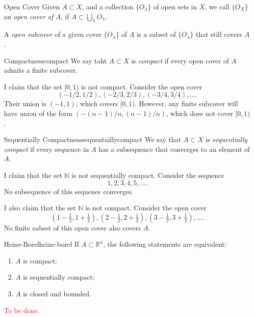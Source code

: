 
\begin{defn}{Open Cover}{}
	Given \(A \subset X\), and a collection \(\{O_\lambda\}\) of open sets in  \(X\), we call \(\{O_X\}\) an \emph{open cover of \(A\)}, if \(A \subset \bigcup_\lambda O_\lambda\).

	A \emph{open subcover} of a given cover \(\{O_\lambda\}\) of \(A\) is a subset of \(\{O_\lambda\}\) that still covers \(A\).
\end{defn}

\begin{defn}{Compactness}{compact}
	We say taht \(A \subset X\) is \emph{compact} if every open cover of \(A\) admits a finite subcover.
\end{defn}

\begin{exmp}{}{}
	I claim that the set \([0, 1)\) is not compact. Consider the open cover \[
		(-1/2, 1/2), (-2/3, 2/3), (-3/4, 3/4), \dots.
	\]
	Their union is \((-1, 1)\), which covers \([0, 1)\). However, any finite subcover will have union of the form \((-(n-1)/n, (n-1)/n)\), which does not cover \([0,1)\).
\end{exmp}

\begin{defn}{Sequentially Compactness}{sequentaillycompact}
	We say that \(A \subset X\) is \emph{sequentially compact} if every sequence in \(A\) has a subsequence that converges to an element of \(A\).
\end{defn}

\begin{exmp}{}{}
	I claim that the set \(\mathbb{N}\) is not sequentially compact. Consider the sequence \[
		1, 2, 3, 4, 5, \dots.
	\]
	No subsequence of this sequence converges.

	I also claim that the set \(\mathbb{N}\) is not compact. Consider the open cover \[
		(1 - \tfrac{1}{2}, 1+\tfrac{1}{2}), (2 - \tfrac{1}{2}, 2+\tfrac{1}{2}), (3-\tfrac{1}{2},3+\tfrac{1}{2}), \dots.
	\]
	No finite subset of this open cover also covers \(A\).
\end{exmp}

\begin{thm}{Heine-Borel}{heine-borel}
	If \(A \subset \mathbb{R}^n\), the following statements are equivalent:
	\begin{enumerate}
		\item \(A\) is compact;
		\item \(A\) is sequentially compact;
		\item \(A\) is closed and bounded.
	\end{enumerate}
\end{thm}

\begin{dem}{}{}
	\textcolor{red}{To be done.}
\end{dem}
